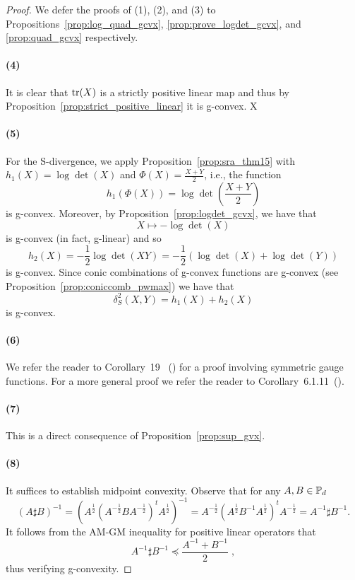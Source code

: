 \documentclass[twoside,11pt]{article}
\begin{document}
\begin{proof}
    We defer the proofs of (1), (2), and (3) to Propositions~\ref{prop:log_quad_gcvx}, \ref{prop:prove_logdet_gcvx}, and \ref{prop:quad_gcvx} respectively.
    \paragraph{(4)} It is clear that $\text{tr}(X)$ is a strictly positive linear map and thus by Proposition~\ref{prop:strict_positive_linear} it is g-convex.
X    \paragraph{(5)} For the S-divergence, we apply Proposition~\ref{prop:sra_thm15} with $h_1(X) = \log \det(X)$ and $\Phi(X) = \frac{X+Y}{2}$, i.e., the function 
    \[
    h_1(\Phi(X)) = \log \det \left(\frac{X+Y}{2}\right)
    \]
    is g-convex. Moreover, by Proposition~\ref{prop:logdet_gcvx}, we have that 
    \[
    X \mapsto -\log \det(X)
    \]
    is g-convex (in fact, g-linear) and so 
    \[
    h_2(X) = -\frac{1}{2}\log\det(XY) = - \frac{1}{2}\left(\log \det(X) + \log \det(Y)\right)
    \]
    is g-convex. Since conic combinations of g-convex functions are g-convex (see Proposition~\ref{prop:coniccomb_pwmax}) we have that
    \[
    \delta_S^2(X,Y) = h_1(X) + h_2(X) 
    \]
    is g-convex.
    \paragraph{(6)} We refer the reader to Corollary~19~ (\citep{sra2015conic}) for a proof involving symmetric gauge functions. For a more general proof we refer the reader to Corollary~6.1.11~(\citep{bhatia_psd}).
    \paragraph{(7)} This is a direct consequence of Proposition~\ref{prop:sup_gvx}.
    \paragraph{(8)} It suffices to establish midpoint convexity. Observe that for any $A,B \in \mathbb{P}_d$ 
    \[
    \left(A \sharp B\right)^{-1} = \left( A^{\frac{1}{2}} \left(A^{-\frac{1}{2}} B A^{-\frac{1}{2}} \right)^t A^{\frac{1}{2}}  \right)^{-1} = A^{-\frac{1}{2}} \left(A^{\frac{1}{2}} B^{-1} A^{\frac{1}{2}} \right)^t A^{-\frac{1}{2}} = A^{-1} \sharp B^{-1}.
    \]
    It follows from the AM-GM inequality for positive linear operators that 
    \[
    A^{-1} \sharp B^{-1} \preceq \frac{A^{-1} + B^{-1}}{2} \; ,
    \]
    thus verifying g-convexity. 
\end{proof}
\end{document}
